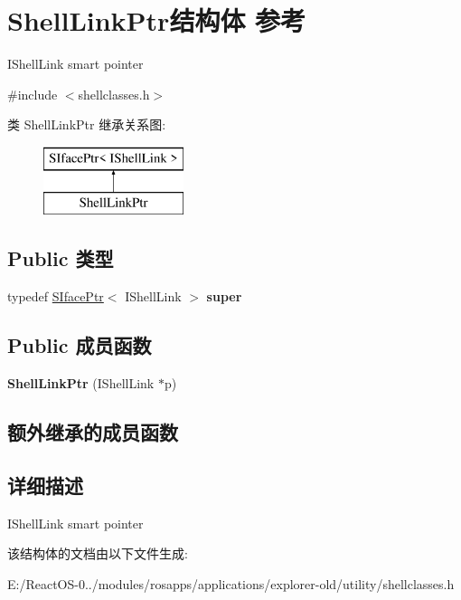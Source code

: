 \hypertarget{struct_shell_link_ptr}{}\section{Shell\+Link\+Ptr结构体 参考}
\label{struct_shell_link_ptr}


I\+Shell\+Link smart pointer  




{\ttfamily \#include $<$shellclasses.\+h$>$}

类 Shell\+Link\+Ptr 继承关系图\+:\begin{figure}[H]
\begin{center}
\leavevmode
\includegraphics[height=2.000000cm]{struct_shell_link_ptr}
\end{center}
\end{figure}
\subsection*{Public 类型}
\begin{DoxyCompactItemize}
\item 
\mbox{\label{struct_shell_link_ptr_aae29f756e27b7b99bc1e78fbf8eb5ac5}} 
typedef \hyperlink{struct_s_iface_ptr}{S\+Iface\+Ptr}$<$ I\+Shell\+Link $>$ {\bfseries super}
\end{DoxyCompactItemize}
\subsection*{Public 成员函数}
\begin{DoxyCompactItemize}
\item 
\mbox{\label{struct_shell_link_ptr_a10171d56b65300bd3dbd2b09d03272f6}} 
{\bfseries Shell\+Link\+Ptr} (I\+Shell\+Link $\ast$p)
\end{DoxyCompactItemize}
\subsection*{额外继承的成员函数}


\subsection{详细描述}
I\+Shell\+Link smart pointer 

该结构体的文档由以下文件生成\+:\begin{DoxyCompactItemize}
\item 
E\+:/\+React\+O\+S-\/0../modules/rosapps/applications/explorer-\/old/utility/shellclasses.\+h\end{DoxyCompactItemize}
